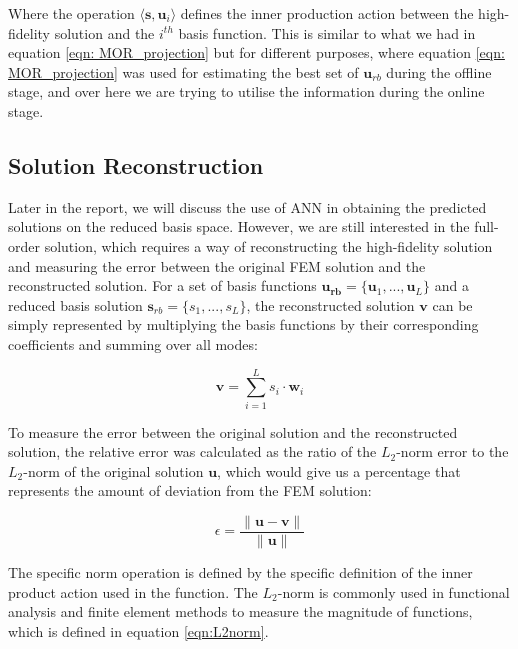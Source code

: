 Where the operation $\langle \mathbf{s}, \mathbf{u}_i \rangle$ defines the inner production action between the high-fidelity solution and the $i^{th}$ basis function. This is similar to what we had in equation \ref{eqn: MOR_projection} but for different purposes, where equation \ref{eqn: MOR_projection} was used for estimating the best set of $\mathbf{u}_{rb}$ during the offline stage, and over here we are trying to utilise the information during the online stage.   

\subsection{Solution Reconstruction}

Later in the report, we will discuss the use of ANN in obtaining the predicted solutions on the reduced basis space. However, we are still interested in the full-order solution, which requires a way of reconstructing the high-fidelity solution and measuring the error between the original FEM solution and the reconstructed solution. For a set of basis functions $\mathbf{u_{rb}} = \{\mathbf{u}_1,...,\mathbf{u}_L\}$ and a reduced basis solution $\mathbf{s}_{rb} = \{s_1,...,s_L\}$, the reconstructed solution $\mathbf{v}$ can be simply represented by multiplying the basis functions by their corresponding coefficients and summing over all modes:

\begin{equation}
    \mathbf{v} = \sum_{i=1}^{L} s_i \cdot \mathbf{w}_i 
    \label{eqn:reconstruction}
\end{equation}

To measure the error between the original solution and the reconstructed solution, the relative error was calculated as the ratio of the $L_2$-norm error to the $L_2$-norm of the original solution $\mathbf{u}$, which would give us a percentage that represents the amount of deviation from the FEM solution:

\begin{equation}
   \epsilon = \frac{\| \mathbf{u} - \mathbf{v} \|}{\| \mathbf{u} \|}
   \label{eqn:norm_error}
\end{equation}

The specific norm operation is defined by the specific definition of the inner product action used in the function. The $L_2$-norm is commonly used in functional analysis and finite element methods to measure the magnitude of functions, which is defined in equation \ref{eqn:L2norm}. 

